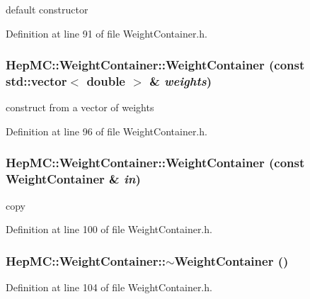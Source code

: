default constructor 



Definition at line 91 of file Weight\-Container.h.
\subsubsection{\setlength{\rightskip}{0pt plus 5cm}Hep\-MC::Weight\-Container::Weight\-Container (const std::vector$<$ double $>$ \& {\em weights})\hspace{0.3cm}{\tt  [inline]}}\label{classHepMC_1_1WeightContainer_84e86a344cc6735ab31819632b424dea}


construct from a vector of weights 



Definition at line 96 of file Weight\-Container.h.
\subsubsection{\setlength{\rightskip}{0pt plus 5cm}Hep\-MC::Weight\-Container::Weight\-Container (const {\bf Weight\-Container} \& {\em in})\hspace{0.3cm}{\tt  [inline]}}\label{classHepMC_1_1WeightContainer_3bca06ea5d5f9b21c4fdaa787e666bb7}


copy 



Definition at line 100 of file Weight\-Container.h.
\subsubsection{\setlength{\rightskip}{0pt plus 5cm}Hep\-MC::Weight\-Container::$\sim$Weight\-Container ()\hspace{0.3cm}{\tt  [inline, virtual]}}\label{classHepMC_1_1WeightContainer_9d480173cd51e65967625b0e87afad8d}




Definition at line 104 of file Weight\-Container.h.

